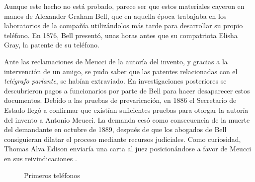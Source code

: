 Aunque este hecho no está probado, parece ser que estos materiales cayeron en manos de Alexander Graham Bell, que en aquella época trabajaba en los laboratorios de la compañía utilizándolos más tarde para desarrollar su propio teléfono. En 1876, Bell presentó, unas horas antes que su compatriota Elisha Gray, la patente de su teléfono. 

Ante las reclamaciones de Meucci de la autoría del invento, y gracias a la intervención de un amigo, se pudo saber que las patentes relacionadas con el \textit{telégrafo parlante}, se habían extraviado. En investigaciones posteriores se descubrieron pagos a funcionarios por parte de Bell para hacer desaparecer estos documentos. Debido a las pruebas de prevaricación, en 1886 el Secretario de Estado llegó a confirmar que existían suficientes pruebas para otorgar la autoría del invento a Antonio Meucci. La demanda cesó como consecuencia de la muerte del demandante en octubre de 1889, después de que los abogados de Bell consiguieran dilatar el proceso mediante recursos judiciales. Como curiosidad, Thomas Alva Edison enviaría una carta al juez posicionándose a favor de Meucci en sus reivindicaciones \cite{Carb07}.

\begin{figure}[h!btp]
	\begin{adjustbox}{minipage=\linewidth, fbox}
		\centering
		\hspace{10mm}
	\end{adjustbox}
	\caption{Primeros teléfonos}
	\label{fig:primeros-telefonos}
\end{figure}


